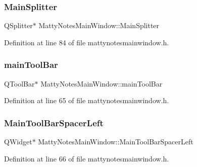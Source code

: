 \subsubsection{\texorpdfstring{Main\+Splitter}{MainSplitter}}
{\footnotesize\ttfamily Q\+Splitter$\ast$ Matty\+Notes\+Main\+Window\+::\+Main\+Splitter\hspace{0.3cm}{\ttfamily [private]}}



Definition at line 84 of file mattynotesmainwindow.\+h.

\hypertarget{classMattyNotesMainWindow_a573c7ad7a77e152e381f377481b15acb}{}\label{classMattyNotesMainWindow_a573c7ad7a77e152e381f377481b15acb} 
\subsubsection{\texorpdfstring{main\+Tool\+Bar}{mainToolBar}}
{\footnotesize\ttfamily Q\+Tool\+Bar$\ast$ Matty\+Notes\+Main\+Window\+::main\+Tool\+Bar\hspace{0.3cm}{\ttfamily [private]}}



Definition at line 65 of file mattynotesmainwindow.\+h.

\hypertarget{classMattyNotesMainWindow_a0c0315e670c5b91955fa08ff7e16a631}{}\label{classMattyNotesMainWindow_a0c0315e670c5b91955fa08ff7e16a631} 
\subsubsection{\texorpdfstring{Main\+Tool\+Bar\+Spacer\+Left}{MainToolBarSpacerLeft}}
{\footnotesize\ttfamily Q\+Widget$\ast$ Matty\+Notes\+Main\+Window\+::\+Main\+Tool\+Bar\+Spacer\+Left\hspace{0.3cm}{\ttfamily [private]}}



Definition at line 66 of file mattynotesmainwindow.\+h.

\hypertarget{classMattyNotesMainWindow_a022f28a03e7d9653aca44e9a11e2997b}{}\label{classMattyNotesMainWindow_a022f28a03e7d9653aca44e9a11e2997b} 
